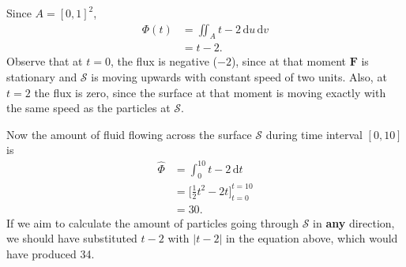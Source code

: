\documentclass[12pt]{article}
\newcommand{\F}{\mathbf{F}}
\newcommand{\FF}{\hat{\Phi}}
\newcommand{\ddt}{\,\mathrm{d}t}
\newcommand{\ddu}{\, \mathrm{d}u}
\newcommand{\ddv}{\, \mathrm{d}v}
\begin{document}
Since $A = \left[ 0, 1 \right]^2$,
\begin{align*}
\Phi(t) &= \iint_A t - 2 \ddu \ddv \\
          &= t - 2.
\end{align*}
Observe that at $t = 0$, the flux is negative ($-2$), since at that moment $\F$ is stationary and $\mathscr{S}$ is moving upwards with constant speed of two units. Also, at $t = 2$ the flux is zero, since the surface at that moment is moving exactly with the same speed as the particles at $\mathscr{S}$.

Now the amount of fluid flowing across the surface $\mathscr{S}$ during time interval $\left[  0, 10 \right]$ is
\begin{align*}
\FF &= \int_0^{10} t - 2 \ddt  \\
      &= \Big[ \frac{1}{2} t^2 - 2t \Big]_{t = 0}^{t = 10} \\
      &= 30.
\end{align*} 
If we aim to calculate the amount of particles going through $\mathscr{S}$ in \textbf{any} direction, we should have substituted $t - 2$ with $|t - 2|$ in the equation above, which would have produced 34.
\end{document}
